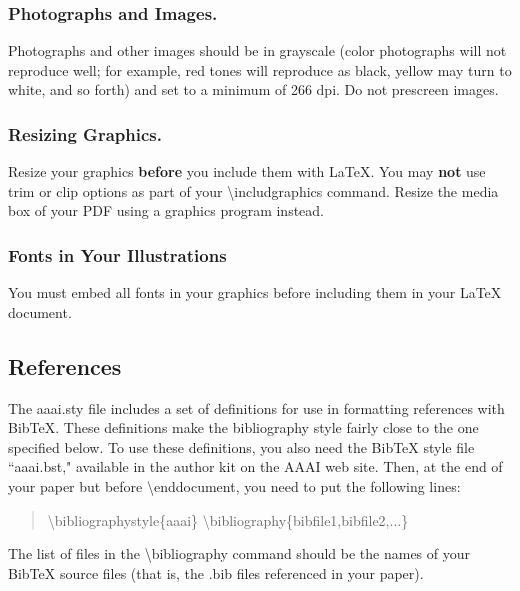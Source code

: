 \documentclass[letterpaper]{article}
\begin{document}
\subsubsection{Photographs and Images.}
Photographs and other images should be in grayscale (color photographs will not reproduce well; for example, red tones will reproduce as black, yellow may turn to white, and so forth) and set to a minimum of 266 dpi. Do not prescreen images.

\subsubsection{Resizing Graphics.}
Resize your graphics \textbf{before} you include them with LaTeX. You may \textbf{not} use trim or clip options as part of your \textbackslash includgraphics command. Resize the media box of your PDF using a graphics program instead. 

\subsubsection{Fonts in Your Illustrations}
You must embed all fonts in your graphics before including them in your LaTeX document.

\subsection{References} 
The aaai.sty file includes a set of definitions for use in formatting references with BibTeX. These definitions make the bibliography style fairly close to the one specified below. To use these definitions, you also need the BibTeX style file ``aaai.bst," available in the author kit on the AAAI web site. Then, at the end of your paper but before \textbackslash end{document}, you need to put the following lines:

\begin{quote}
\begin{small}
\textbackslash bibliographystyle\{aaai\}
\textbackslash bibliography\{bibfile1,bibfile2,...\}
\end{small}
\end{quote}

The list of files in the \textbackslash  bibliography command should be the names of your BibTeX source files (that is, the .bib files referenced in your paper).
\end{document}
